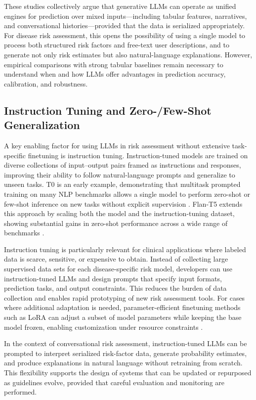 These studies collectively argue that generative LLMs can operate as unified engines for prediction over mixed inputs—including tabular features, narratives, and conversational histories—provided that the data is serialized appropriately. For disease risk assessment, this opens the possibility of using a single model to process both structured risk factors and free-text user descriptions, and to generate not only risk estimates but also natural-language explanations. However, empirical comparisons with strong tabular baselines remain necessary to understand when and how LLMs offer advantages in prediction accuracy, calibration, and robustness.

\subsection{Instruction Tuning and Zero-/Few-Shot Generalization}

A key enabling factor for using LLMs in risk assessment without extensive task-specific finetuning is instruction tuning. Instruction-tuned models are trained on diverse collections of input–output pairs framed as instructions and responses, improving their ability to follow natural-language prompts and generalize to unseen tasks. T0 is an early example, demonstrating that multitask prompted training on many NLP benchmarks allows a single model to perform zero-shot or few-shot inference on new tasks without explicit supervision \cite{sanh2021multitask}. Flan-T5 extends this approach by scaling both the model and the instruction-tuning dataset, showing substantial gains in zero-shot performance across a wide range of benchmarks \cite{chung2024scaling}.

Instruction tuning is particularly relevant for clinical applications where labeled data is scarce, sensitive, or expensive to obtain. Instead of collecting large supervised data sets for each disease-specific risk model, developers can use instruction-tuned LLMs and design prompts that specify input formats, prediction tasks, and output constraints. This reduces the burden of data collection and enables rapid prototyping of new risk assessment tools. For cases where additional adaptation is needed, parameter-efficient finetuning methods such as LoRA can adjust a subset of model parameters while keeping the base model frozen, enabling customization under resource constraints \cite{hu2022lora}.

In the context of conversational risk assessment, instruction-tuned LLMs can be prompted to interpret serialized risk-factor data, generate probability estimates, and produce explanations in natural language without retraining from scratch. This flexibility supports the design of systems that can be updated or repurposed as guidelines evolve, provided that careful evaluation and monitoring are performed.

